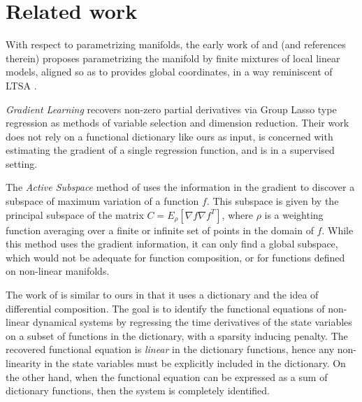 \section{Related work}
\label{sec:related}

With respect to parametrizing manifolds, the early work of
\citet{saulRoweis:03jmlr} and \citet{tehRoweis:nips} (and references therein)
proposes parametrizing the manifold by finite mixtures of local linear
models, aligned so as to provides global coordinates, in a way
reminiscent of LTSA \citep{ZhangZ:04}. 

{\em Gradient Learning} \citep{Ye2012} recovers non-zero partial
derivatives via Group Lasso type regression as methods of variable
selection and dimension reduction. Their work does not rely on a functional dictionary like ours as input,
is concerned with estimating the gradient of a single regression function,
and is in a supervised setting.

The {\em Active Subspace} method of \citet{Constantine2014} uses the information in the gradient to discover a subspace of maximum variation of a function $f$. This subspace is given by the principal subspace of the matrix $C=E_\rho[\nabla f\nabla f^T]$, where $\rho $ is a weighting function averaging over a finite or infinite set of points in the domain of $f$. While this method uses the gradient information, it can only find a global subspace, which would not be adequate for function composition, or for functions defined on non-linear manifolds.

The work of \citet{Brunton-2016dt} is similar to ours in that it uses a
dictionary and the idea of differential composition. The goal is to identify the functional equations of
non-linear dynamical systems by regressing the time derivatives of the
state variables on a subset of functions in the dictionary, with a
sparsity inducing penalty. The recovered functional equation is {\em
  linear} in the dictionary functions, hence any non-linearity in the state variables must be explicitly included in the dictionary. On the other hand, when the functional equation can be expressed as a sum of dictionary functions, then the system is completely identified.

